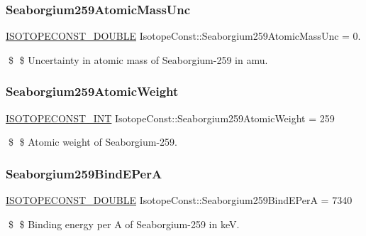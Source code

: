 \subsubsection{\texorpdfstring{Seaborgium259\+Atomic\+Mass\+Unc}{Seaborgium259AtomicMassUnc}}
{\footnotesize\ttfamily \mbox{\hyperlink{group___isotope_const-_macros_ga8f45a7272ce02c0b4c65c44636ed719a}{I\+S\+O\+T\+O\+P\+E\+C\+O\+N\+S\+T\+\_\+\+D\+O\+U\+B\+LE}} Isotope\+Const\+::\+Seaborgium259\+Atomic\+Mass\+Unc = 0.}

\$ \$ Uncertainty in atomic mass of Seaborgium-\/259 in amu. \mbox{\label{group___isotope_const-_seaborgium-_sg259_gac19e7e86ab70c59087d9fabd1021381d}} 
\subsubsection{\texorpdfstring{Seaborgium259\+Atomic\+Weight}{Seaborgium259AtomicWeight}}
{\footnotesize\ttfamily \mbox{\hyperlink{group___isotope_const-_macros_ga5f18360b3e99483a35c32d789e62621c}{I\+S\+O\+T\+O\+P\+E\+C\+O\+N\+S\+T\+\_\+\+I\+NT}} Isotope\+Const\+::\+Seaborgium259\+Atomic\+Weight = 259}

\$ \$ Atomic weight of Seaborgium-\/259. \mbox{\label{group___isotope_const-_seaborgium-_sg259_ga4fc0fdbdae58bcb602c16298f21941fd}} 
\subsubsection{\texorpdfstring{Seaborgium259\+Bind\+E\+PerA}{Seaborgium259BindEPerA}}
{\footnotesize\ttfamily \mbox{\hyperlink{group___isotope_const-_macros_ga8f45a7272ce02c0b4c65c44636ed719a}{I\+S\+O\+T\+O\+P\+E\+C\+O\+N\+S\+T\+\_\+\+D\+O\+U\+B\+LE}} Isotope\+Const\+::\+Seaborgium259\+Bind\+E\+PerA = 7340}

\$ \$ Binding energy per A of Seaborgium-\/259 in keV. \mbox{\label{group___isotope_const-_seaborgium-_sg259_ga340130910e1196253e64f804a797fab7}} 
